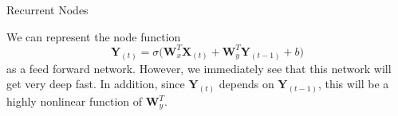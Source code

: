 \documentclass[10pt, table, dvipsnames,xcdraw, handout]{beamer}
\def\layersep{2.5cm}
\begin{document}
\begin{frame}[fragile]{Recurrent Nodes}
\begin{minipage}[t][0.5\textheight][t]{\textwidth}
\begin{center}
\end{center}
  \end{minipage}
  \vfill
\begin{minipage}[t][0.5\textheight][t]{\textwidth}
We can represent the node function
$$
\mathbf{Y}_{(t)} = \sigma\big( \mathbf{W}_x^T \mathbf{X}_{(t)} + \mathbf{W}_y^T \mathbf{Y}_{(t-1)} + b \big)
$$
as a feed forward network. However, we immediately see that this network will get very deep fast. In addition, since $\mathbf{Y}_{(t)}$ depends on $\mathbf{Y}_{(t-1)}$, this will be a highly nonlinear function of $\mathbf{W}_y^T $.
\end{minipage}
\end{frame}
\end{document}

